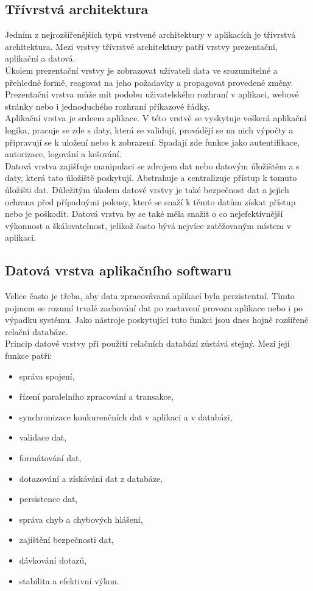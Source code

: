 \documentclass[ing,male,java,dept456]{diploma}						%
\begin{document}
\subsection{Třívrstvá architektura}

Jedním z nejrozšířenějších typů vrstvené architektury v aplikacích je třívrstvá architektura. Mezi vrstvy třívrstvé architektury patří vrstvy prezentační, aplikační a datová. \\
Úkolem prezentační vrstvy je zobrazovat uživateli data ve srozumitelné a přehledné formě, reagovat na jeho požadavky a propagovat provedené změny. Prezentační vrstva může mít podobu uživatelského rozhraní v aplikaci, webové stránky nebo i jednoduchého rozhraní příkazové řádky. \\
Aplikační vrstva je srdcem aplikace. V této vrstvě se vyskytuje veškerá aplikační logika, pracuje se zde s daty, která se validují, provádějí se na nich výpočty a připravují se k uložení nebo k zobrazení. Spadají zde funkce jako autentifikace, autorizace, logování a kešování. \\
Datová vrstva zajišťuje manipulaci se zdrojem dat nebo datovým úložištěm a s daty, která tato úložiště poskytují. Abstrahuje a centralizuje přístup k tomuto úložišti dat. Důležitým úkolem datové vrstvy je také bezpečnost dat a jejich ochrana před případnými pokusy, které se snaží k těmto datům získat přístup nebo je poškodit. Datová vrstva by se také měla snažit o co nejefektivnější výkonnost a škálovatelnost, jelikož často bývá nejvíce zatěžovaným místem v aplikaci. \\

\subsection{Datová vrstva aplikačního softwaru}
\label{subsec:Data-layer}
Velice často je třeba, aby data zpracovávaná aplikací byla perzistentní. Tímto pojmem se rozumí trvalé zachování dat po zastavení provozu aplikace nebo i po výpadku systému. Jako nástroje poskytující tuto funkci jsou dnes hojně rozšířené relační databáze. \\
Princip datové vrstvy při použití relačních databází zůstává stejný. Mezi její funkce patří:
\begin{itemize}
\item správa spojení,
\item řízení paralelního zpracování a transakce,
\item synchronizace konkurenčních dat v aplikaci a v databázi,
\item validace dat,
\item formátování dat,
\item dotazování a získávání dat z databáze,
\item persistence dat,
\item správa chyb a chybových hlášení,
\item zajištění bezpečnosti dat,
\item dávkování dotazů,
\item stabilita a efektivní výkon.
\end{itemize}
\end{document}
